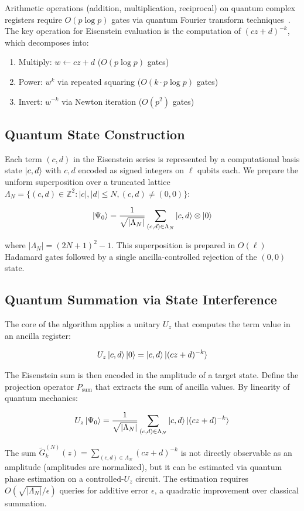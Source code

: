 Arithmetic operations (addition, multiplication, reciprocal) on
quantum complex registers require $O(p \log p)$ gates via quantum
Fourier transform techniques~\cite{nielsen2010}. The key operation
for Eisenstein evaluation is the computation of $(cz+d)^{-k}$, which
decomposes into:

\begin{enumerate}[nosep]
  \item Multiply: $w \leftarrow cz + d$ \quad ($O(p \log p)$ gates)
  \item Power: $w^k$ via repeated squaring \quad ($O(k \cdot p \log p)$ gates)
  \item Invert: $w^{-k}$ via Newton iteration \quad ($O(p^2)$ gates)
\end{enumerate}

\subsection{Quantum State Construction}

Each term $(c,d)$ in the Eisenstein series is represented by a
computational basis state $\ket{c,d}$ with $c,d$ encoded as signed
integers on $\ell$ qubits each. We prepare the uniform superposition
over a truncated lattice $\Lambda_N = \{(c,d) \in \mathbb{Z}^2 :
|c|, |d| \leq N, (c,d) \neq (0,0)\}$:

\begin{equation}\label{eq:superposition}
\ket{\Psi_0} = \frac{1}{\sqrt{|\Lambda_N|}}
\sum_{(c,d) \in \Lambda_N} \ket{c,d} \otimes \ket{0}
\end{equation}

where $|\Lambda_N| = (2N+1)^2 - 1$. This superposition is prepared
in $O(\ell)$ Hadamard gates followed by a single ancilla-controlled
rejection of the $(0,0)$ state.

\subsection{Quantum Summation via State Interference}

The core of the algorithm applies a unitary $U_z$ that computes the
term value in an ancilla register:

\[
U_z \ket{c,d}\ket{0} = \ket{c,d}\ket{(cz+d)^{-k}}
\]

The Eisenstein sum is then encoded in the amplitude of a target state.
Define the projection operator $P_{\mathrm{sum}}$ that extracts the
sum of ancilla values. By linearity of quantum mechanics:

\begin{equation}\label{eq:interference}
U_z \ket{\Psi_0} = \frac{1}{\sqrt{|\Lambda_N|}}
\sum_{(c,d) \in \Lambda_N} \ket{c,d}\ket{(cz+d)^{-k}}
\end{equation}

The sum $\tilde{G}_k^{(N)}(z) = \sum_{(c,d) \in \Lambda_N} (cz+d)^{-k}$
is not directly observable as an amplitude (amplitudes are normalized),
but it can be estimated via quantum phase estimation on a
controlled-$U_z$ circuit. The estimation requires
$O(\sqrt{|\Lambda_N|} / \epsilon)$ queries for additive error
$\epsilon$, a quadratic improvement over classical summation.

